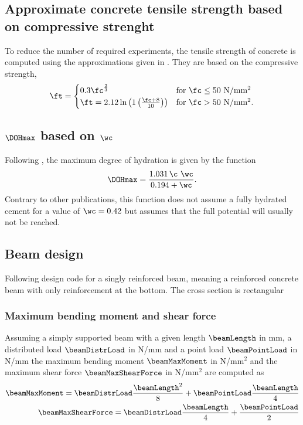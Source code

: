 \subsection{Approximate concrete tensile strength based on compressive strenght}
To reduce the number of required experiments, the tensile strength of concrete is computed using the approximations given in \citeauthor{DIN1992-1-1}.
They are based on the compressive strength, 
\begin{align}
\ft = 
\begin{cases}
0.3 \fc^{\frac{2}{3}}  & \text{for $\fc \le 50$ N/mm$^2$}\\
\ft =2.12 \ln \left( 1 \left( \frac{\fc + 8}{10}\right) \right)& \text{for $\fc > 50$ N/mm$^2$}  \label{eq:tensilstrength}.
\end{cases}
\end{align}
\subsection{$\DOHmax$ based on $\wc$}
Following \cite{Mills1966fico}, the maximum degree of hydration is given by the function
\begin{align}
	\DOHmax = \dfrac{1.031\,¸\wc}{0.194 + \wc}.
\end{align}
Contrary to other publications, this function does not assume a fully hydrated cement for a value of $\wc = 0.42$ but assumes that the full potential will usually not be reached.
\subsection{Beam design}
Following design code for a singly reinforced beam, meaning a reinforced concrete beam with only reinforcement at the bottom.
The cross section is rectangular

\subsubsection{Maximum bending moment and shear force}
Assuming a simply supported beam with a given length $\beamLength$ in mm, a distributed load $\beamDistrLoad$ in N/mm and a point load $\beamPointLoad$ in N/mm
the maximum bending moment $\beamMaxMoment$ in N/mm$^2$ and the maximum shear force $\beamMaxShearForce$ in N/mm$^2$ are computed as
\begin{align}
	\beamMaxMoment= \beamDistrLoad \frac{\beamLength^2}{8} + \beamPointLoad \frac{\beamLength}{4}\\
	\beamMaxShearForce = \beamDistrLoad \frac{\beamLength}{4} + \frac{\beamPointLoad}{2}
\end{align}

